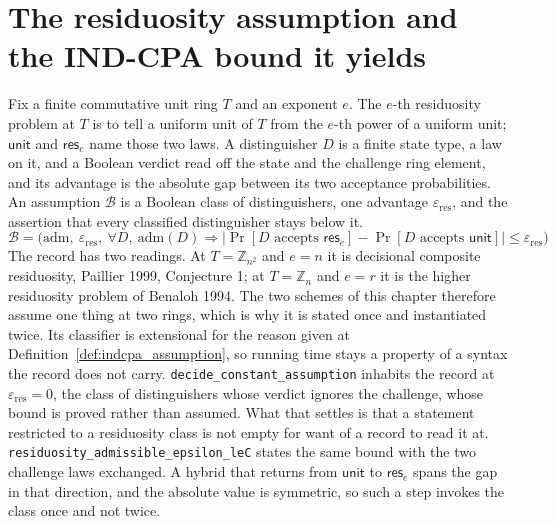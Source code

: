 \section{The residuosity assumption and the IND-CPA bound it yields}

\begin{definition}
  \label{def:residuosity_assumption}
  \rocqok
  Fix a finite commutative unit ring $T$ and an exponent $e$. The $e$-th
  residuosity problem at $T$ is to tell a uniform unit of $T$ from the $e$-th
  power of a uniform unit; $\mathsf{unit}$ and $\mathsf{res}_e$ name those two
  laws. A distinguisher $D$ is a finite state type, a law on it, and a Boolean
  verdict read off the state and the challenge ring element, and its advantage
  is the absolute gap between its two acceptance probabilities. An assumption
  $\mathcal{B}$ is a Boolean class of distinguishers, one advantage
  $\varepsilon_{\mathrm{res}}$, and the assertion that every classified
  distinguisher stays below it.
  \[ \mathcal{B} = \Big(\mathrm{adm},\ \varepsilon_{\mathrm{res}},\
       \forall D,\ \mathrm{adm}(D) \Rightarrow
       \big\lvert \Pr[D \text{ accepts } \mathsf{res}_e]
         - \Pr[D \text{ accepts } \mathsf{unit}] \big\rvert
       \le \varepsilon_{\mathrm{res}}\Big) \]
  The record has two readings. At $T = \mathbb{Z}_{n^2}$ and $e = n$ it is
  decisional composite residuosity, Paillier 1999, Conjecture 1; at
  $T = \mathbb{Z}_n$ and $e = r$ it is the higher residuosity problem of
  Benaloh 1994. The two schemes of this chapter therefore assume one thing at
  two rings, which is why it is stated once and instantiated twice. Its
  classifier is extensional for the reason given at
  Definition~\ref{def:indcpa_assumption}, so running time stays a property of a
  syntax the record does not carry. \texttt{decide\_constant\_assumption}
  inhabits the record at $\varepsilon_{\mathrm{res}} = 0$, the class of
  distinguishers whose verdict ignores the challenge, whose bound is proved
  rather than assumed. What that settles is that a statement restricted to a
  residuosity class is not empty for want of a record to read it at.
  \texttt{residuosity\_admissible\_epsilon\_leC} states the same bound with the
  two challenge laws exchanged. A hybrid that returns from $\mathsf{unit}$ to
  $\mathsf{res}_e$ spans the gap in that direction, and the absolute value is
  symmetric, so such a step invokes the class once and not twice.
\end{definition}

